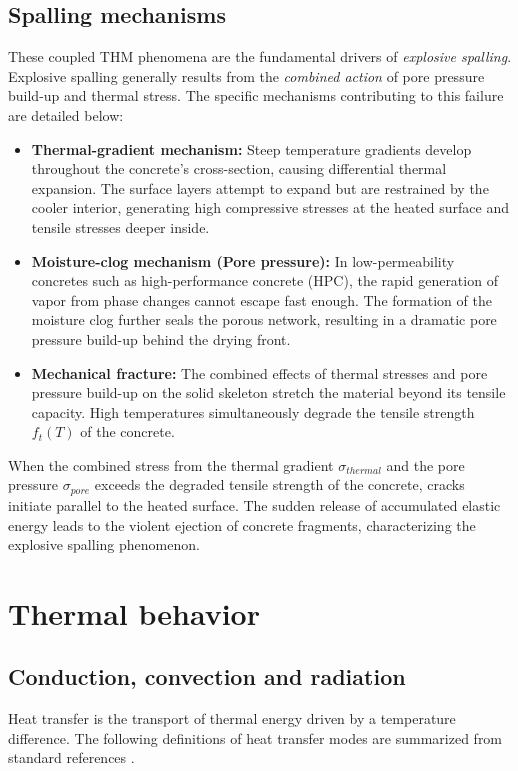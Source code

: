 \subsection{Spalling mechanisms}
These coupled THM phenomena are the fundamental drivers of \emph{explosive spalling}. Explosive spalling generally results from the \emph{combined action} of pore pressure build-up and thermal stress. The specific mechanisms contributing to this failure are detailed below:
\begin{itemize}
    \item \textbf{Thermal-gradient mechanism:} Steep temperature gradients develop throughout the concrete's cross-section, causing differential thermal expansion. The surface layers attempt to expand but are restrained by the cooler interior, generating high compressive stresses at the heated surface and tensile stresses deeper inside.
    \item \textbf{Moisture-clog mechanism (Pore pressure):} In low-permeability concretes such as high-performance concrete (HPC), the rapid generation of vapor from phase changes cannot escape fast enough. The formation of the moisture clog further seals the porous network, resulting in a dramatic pore pressure build-up behind the drying front.
    \item \textbf{Mechanical fracture:} The combined effects of thermal stresses and pore pressure build-up on the solid skeleton stretch the material beyond its tensile capacity. High temperatures simultaneously degrade the tensile strength $f_t(T)$ of the concrete.
\end{itemize}

When the combined stress from the thermal gradient $\sigma_{thermal}$ and the pore pressure $\sigma_{pore}$ exceeds the degraded tensile strength of the concrete, cracks initiate parallel to the heated surface. The sudden release of accumulated elastic energy leads to the violent ejection of concrete fragments, characterizing the explosive spalling phenomenon.

\section{Thermal behavior}

\subsection{Conduction, convection and radiation}
Heat transfer is the transport of thermal energy driven by a temperature difference. The following definitions of heat transfer modes are summarized from standard references \cite{bergman2017}.

